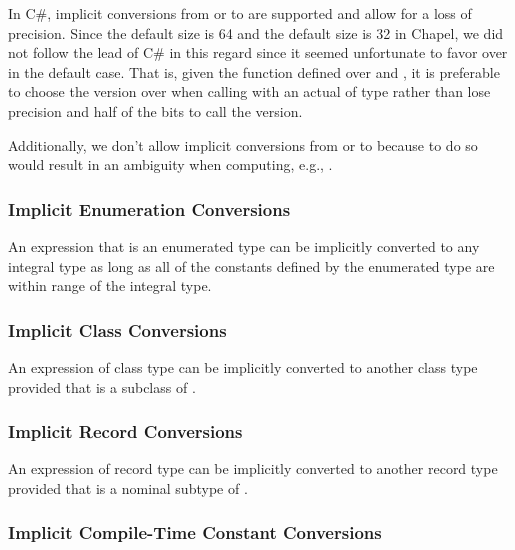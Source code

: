 \begin{rationale}
In C\#, implicit conversions from  or 
to  are supported and allow for a loss of precision.
Since the default  size is 64 and the default 
size is 32 in Chapel, we did not follow the lead of C\# in this regard
since it seemed unfortunate to favor  over 
in the default case.  That is, given the  function defined
over  and , it is preferable to choose the
version over  when calling with an actual of
type  rather than lose precision and half of the bits to
call the  version.

Additionally, we don't allow implicit conversions from 
or  to  because to do so would result in
an ambiguity when computing, e.g., .
\end{rationale}

\subsubsection{Implicit Enumeration Conversions}
\label{Implicit_Enumeration_Conversions}

An expression that is an enumerated type can be implicitly converted
to any integral type as long as all of the constants defined by the
enumerated type are within range of the integral type.

\subsubsection{Implicit Class Conversions}
\label{Implicit_Class_Conversions}

An expression of class type  can be implicitly converted to
another class type  provided that  is a subclass
of .

\subsubsection{Implicit Record Conversions}
\label{Implicit_Record_Conversions}

An expression of record type  can be implicitly converted to
another record type  provided that  is a nominal
subtype of .

\subsubsection{Implicit Compile-Time Constant Conversions}
\label{Implicit_Compile_Time_Constant_Conversions}

